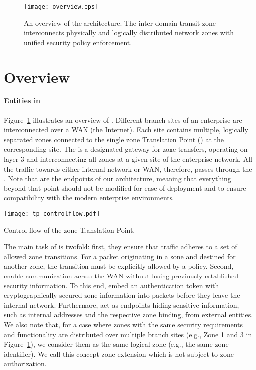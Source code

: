 \begin{figure}[htb]
	\begin{center}
		\texttt{[image: overview.eps]}
	\end{center}
	\caption{An overview of the \name architecture. The inter-domain transit zone interconnects physically
		and logically distributed network zones with unified security policy enforcement.}
	\label{fig:overview}
\end{figure}

\section{\name Overview}
\label{sec:overview}

\paragraph{Entities in \name}
Figure~\ref{fig:overview} illustrates an overview of \name.
Different branch sites of an enterprise are interconnected over a WAN (\eg the Internet). Each site
contains multiple, logically separated zones connected to the single zone
Translation Point (\tp) at the corresponding site. The \tp is a designated gateway
for zone transfers, operating on layer 3 and interconnecting all zones at a given
site of the enterprise network. All the traffic towards either internal network or
WAN, therefore, passes through the \tp. Note that \tps are the endpoints
of our architecture, meaning that everything beyond that point should not be
modified for ease of deployment and to ensure compatibility with the modern enterprise
environments.

\begin{floatingfigure}[r]{0.69\linewidth}
	\centering
	\texttt{[image: tp\_controlflow.pdf]}
	\caption{Control flow of the zone Translation Point.}
	\label{fig:flow}
\end{floatingfigure}

The main task of \tps is twofold: first, they ensure that traffic adheres to a
set of allowed zone transitions. For a packet originating in a zone and destined
for another zone, the transition must be explicitly allowed by a policy. Second,
\tps enable communication across the WAN without losing previously established
security information. To this end, \tps embed an authentication token with
cryptographically secured zone information into packets before they leave the
internal network. Furthermore, \tps act as endpoints hiding sensitive
information, such as internal addresses and the respective zone binding, from
external entities. We also note that, for a case where zones with the same
security requirements and functionality are distributed over multiple branch
sites (e.g., Zone 1 and 3 in Figure~\ref{fig:overview}), we consider them as the
same logical zone (e.g., the same zone identifier). We call this concept zone
extension which is not subject to zone authorization.

